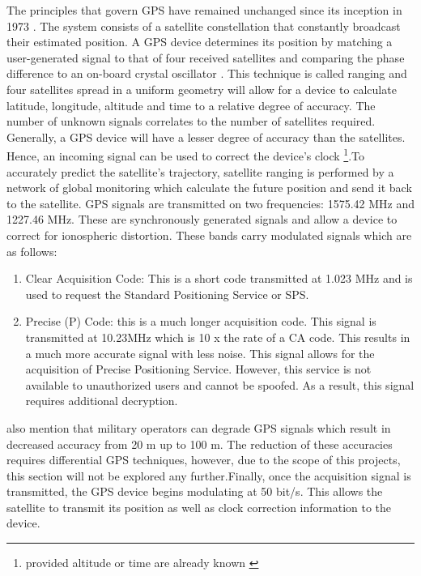 The principles that govern GPS have remained unchanged since its inception in 1973 \cite{spilker1996global}. The system consists of a satellite constellation that constantly broadcast their estimated position. A GPS device determines its position by matching a user-generated signal to that of four received satellites and comparing the phase difference to an on-board crystal oscillator \cite{spilker1996global}. This technique is called ranging and four satellites spread in a uniform geometry will allow for a device to calculate latitude, longitude, altitude and time to a relative degree of accuracy. The number of unknown signals correlates to the number of satellites required. Generally, a GPS device will have a lesser degree of accuracy than the satellites. Hence, an incoming signal can be used to correct the device's clock \footnote{provided altitude or time are already known \cite{spilker1996global}}.To accurately predict the satellite's trajectory, satellite ranging is performed by a network of global monitoring which calculate the future position and send it back to the satellite. GPS signals are transmitted on two frequencies: 1575.42 MHz and 1227.46 MHz\cite{spilker1996global}. These are synchronously generated signals and allow a device to correct for ionospheric distortion. These bands carry modulated signals which are as follows: \cite{spilker1996global}


\begin{enumerate}
	\item Clear Acquisition Code:  This is a short code transmitted at 1.023 MHz and is used to request the Standard Positioning Service or SPS.
	\item Precise (P) Code: this is a much longer acquisition code. This signal is transmitted at 10.23MHz which is 10 x the rate of a CA code. This results in a much more accurate signal with less noise. This signal allows for the acquisition of Precise Positioning Service. However, this service is not available to unauthorized users and cannot be spoofed. As a result, this signal requires additional decryption.    
\end{enumerate}

\textcite{spilker1996global} also mention that military operators can degrade GPS signals which result in decreased accuracy from 20 m up to 100 m. The reduction of these accuracies requires differential GPS techniques, however, due to the scope of this projects, this section will not be explored any further.Finally, once the acquisition signal is transmitted, the GPS device begins modulating at 50 bit/s. This allows the satellite to transmit its position as well as clock correction information to the device.\par

